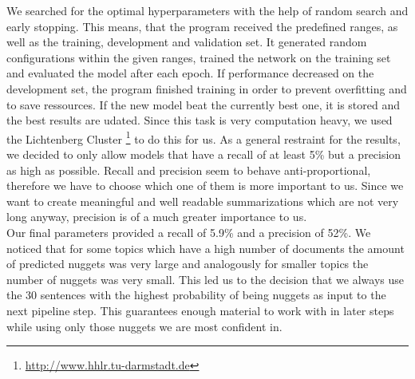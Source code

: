 We searched for the optimal hyperparameters with the help of random search and early stopping. This means, that the program received the predefined ranges, as well as the training, development and validation set. It generated random configurations within the given ranges, trained the network on the training set and evaluated the model after each epoch. If performance decreased on the development set, the program finished training in order to prevent overfitting and to save ressources. If the new model beat the currently best one, it is stored and the best results are udated. Since this task is very computation heavy, we used the Lichtenberg Cluster \footnote[4]{\url{http://www.hhlr.tu-darmstadt.de}} to do this for us. As a general restraint for the results, we decided to only allow models that have a recall of at least 5\% but a precision as high as possible. Recall and precision seem to behave anti-proportional, therefore we have to choose which one of them is more important to us. Since we want to create meaningful and well readable summarizations which are not very long anyway, precision is of a much greater importance to us. \\
Our final parameters provided a recall of 5.9\% and a precision of 52\%. We noticed that for some topics which have a high number of documents the amount of predicted nuggets was very large and analogously for smaller topics the number of nuggets was very small. This led us to the decision that we always use the 30 sentences with the highest probability of being nuggets as input to the next pipeline step. This guarantees enough material to work with in later steps while using only those nuggets we are most confident in.\\
